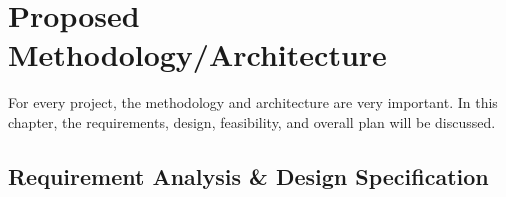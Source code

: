 
\chapter{Proposed Methodology/Architecture}



\begin{center}
    

For every project, the methodology and architecture are very important. In this chapter, the requirements, design, feasibility, and overall plan will be discussed. 
    
\end{center}



\section{Requirement Analysis \& Design Specification}
